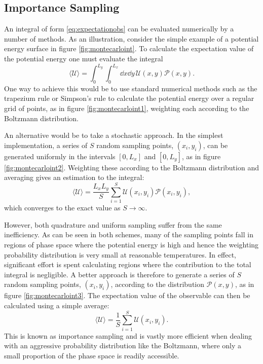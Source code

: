 \subsection{Importance Sampling}

An integral of form \eqref{eq:expectationobs} can be evaluated numerically by a number of methods.
As an illustration, consider the simple example of a \td{} potential energy surface in figure \ref{fig:montecarloint}.
To calculate the expectation value of the potential energy one must evaluate the integral
\begin{equation}
	\langle \mathcal{U} \rangle = \int_{0}^{L_y}\int_{0}^{L_x} \dd x \dd y\, \mathcal{U}\left(x,y\right)\mathcal{P}\left(x,y\right).
\end{equation}
One way to achieve this would be to use standard numerical methods such as the trapezium rule or Simpson's rule to calculate the potential energy over a regular grid of points, as in figure \ref{fig:montecarloint1}, weighting each according to the Boltzmann distribution.

An alternative would be to take a stochastic approach.
In the simplest implementation, a series of $S$ random sampling points, $\left(x_i,y_i\right)$, can be generated uniformly in the intervals $\left[0,L_x\right]$ and $\left[0,L_y\right]$, as in figure \ref{fig:montecarloint2}.
Weighting these according to the Boltzmann distribution and averaging gives an estimation to the integral:
\begin{equation}
	\langle \mathcal{U} \rangle = \frac{L_xL_y}{S}\sum_{i=1}^{S} \mathcal{U}\left(x_i,y_i\right)\mathcal{P}\left(x_i,y_i\right),
\end{equation}
which converges to the exact value as $S\rightarrow\infty$.

However, both quadrature and \mc{} uniform sampling suffer from the same inefficiency.
As can be seen in both schemes, many of the sampling points fall in regions of phase space where the potential energy is high and hence the weighting probability distribution is very small at reasonable temperatures.
In effect, significant effort is spent calculating regions where the contribution to the total integral is negligible.
A better approach is therefore to generate a series of $S$ random sampling points, $\left(x_i,y_i\right)$, according to the distribution $\mathcal{P}\left(x,y\right)$, as in figure \ref{fig:montecarloint3}.
The expectation value of the observable can then be calculated using a simple average:
\begin{equation}
	\langle \mathcal{U} \rangle = \frac{1}{S}\sum_{i=1}^{S} \mathcal{U}\left(x_i,y_i\right).
\end{equation}
This is known as importance sampling and is vastly more efficient when dealing with an aggressive probability distribution like the Boltzmann, where only a small proportion of the phase space is readily accessible.

